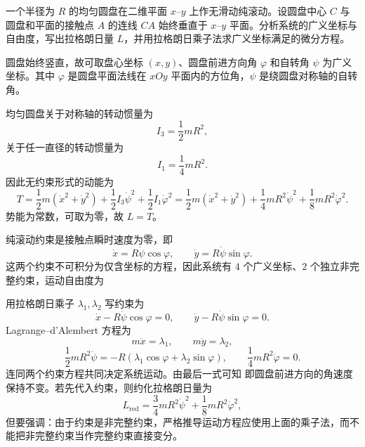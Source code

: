 
\begin{question}[圆盘的非完整约束]
一个半径为 $R$ 的均匀圆盘在二维平面 $x$--$y$ 上作无滑动纯滚动。设圆盘中心 $C$ 与圆盘和平面的接触点 $A$ 的连线 $CA$ 始终垂直于 $x$--$y$ 平面。分析系统的广义坐标与自由度，写出拉格朗日量 $L$，并用拉格朗日乘子法求广义坐标满足的微分方程。

\begin{solution}
圆盘始终竖直，故可取盘心坐标 $(x,y)$、圆盘前进方向角 $\varphi$ 和自转角 $\psi$ 为广义坐标。其中 $\varphi$ 是圆盘平面法线在 $xOy$ 平面内的方位角，$\psi$ 是绕圆盘对称轴的自转角。

均匀圆盘关于对称轴的转动惯量为
\[
  I_3=\frac12mR^2,
\]
关于任一直径的转动惯量为
\[
  I_1=\frac14mR^2.
\]
因此无约束形式的动能为
\[
  T=\frac12m(\dot x^2+\dot y^2)
    +\frac12 I_3\dot\psi^2+\frac12 I_1\dot\varphi^2
  =\frac12m(\dot x^2+\dot y^2)
    +\frac14mR^2\dot\psi^2+\frac18mR^2\dot\varphi^2 .
\]
势能为常数，可取为零，故 $L=T$。

纯滚动约束是接触点瞬时速度为零，即
\[
  \dot x=R\dot\psi\cos\varphi,
  \qquad
  \dot y=R\dot\psi\sin\varphi .
\]
这两个约束不可积分为仅含坐标的方程，因此系统有 $4$ 个广义坐标、$2$ 个独立非完整约束，运动自由度为

用拉格朗日乘子 $\lambda_1,\lambda_2$ 写约束为
\[
  \dot x-R\dot\psi\cos\varphi=0,
  \qquad
  \dot y-R\dot\psi\sin\varphi=0 .
\]
Lagrange--d'Alembert 方程为
\[
  m\ddot x=\lambda_1,
  \qquad
  m\ddot y=\lambda_2,
\]
\[
  \frac12mR^2\ddot\psi
  =-R(\lambda_1\cos\varphi+\lambda_2\sin\varphi),
  \qquad
  \frac14mR^2\ddot\varphi=0.
\]
连同两个约束方程共同决定系统运动。由最后一式可知
即圆盘前进方向的角速度保持不变。若先代入约束，则约化拉格朗日量为
\[
  L_{\mathrm{red} }
  =\frac34mR^2\dot\psi^2+\frac18mR^2\dot\varphi^2,
\]
但要强调：由于约束是非完整约束，严格推导运动方程应使用上面的乘子法，而不能把非完整约束当作完整约束直接变分。
\end{solution}

\end{question}

